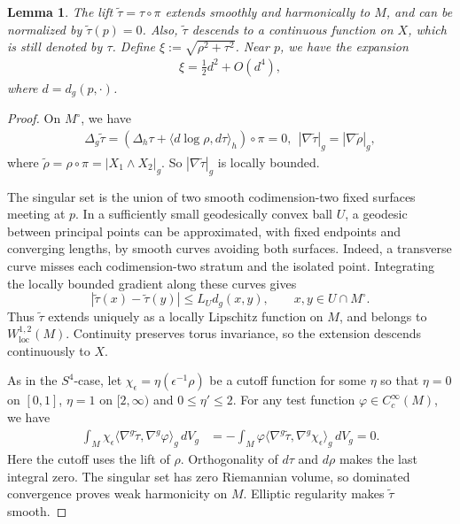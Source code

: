 \documentclass[letterpaper]{amsart}
\newtheorem{lem}[thm]{Lemma}
\theoremstyle{definition}
\theoremstyle{remark}
\begin{document}
\begin{lem}\label{lem-conjugate}
	The lift $\tilde{\tau }=\tau \circ \pi $ extends smoothly and harmonically to $M$, and can be normalized by $\tilde{\tau} (p)=0$. Also, $\tilde{\tau }$ descends to a continuous function on $X$, which is still denoted by $\tau $. Define $\xi := \sqrt{\rho ^2+ \tau ^2} $. Near $p$, we have the expansion
	\begin{align*}
		\xi = \frac{1}{2}d ^2+ O(d ^{4}),
	\end{align*} 
	where $d = d_g(p, \cdot )$.
\end{lem}
\begin{proof}
	On $M ^{\circ}$, we have
	\begin{align*}
		\Delta _{g} \tilde{\tau } = ( \Delta _{h} \tau + \langle d \log \rho , d \tau  \rangle_h ) \circ \pi =0,\ \ |\nabla \tilde{\tau }|_g = |\nabla \tilde{\rho }|_g,
	\end{align*} 
	where $\tilde{\rho } = \rho \circ \pi = |X_1 \wedge X_2|_g$. So $|\nabla \tilde{\tau }|_g$ is locally bounded.

	The singular set is the union of two smooth codimension-two fixed surfaces meeting at $p$. In a sufficiently small geodesically convex ball $U$, a geodesic between principal points can be approximated, with fixed endpoints and converging lengths, by smooth curves avoiding both surfaces. Indeed, a transverse curve misses each codimension-two stratum and the isolated point. Integrating the locally bounded gradient along these curves gives
\[
 |\tilde\tau(x)-\tilde\tau(y)|\le L_Ud_g(x,y),\qquad x,y\in U\cap M^\circ.
\]
Thus $\tilde\tau$ extends uniquely as a locally Lipschitz function on $M$, and belongs to $W^{1,2}_{\mathrm{loc}}(M)$. Continuity preserves torus invariance, so the extension descends continuously to $X$.

	As in the $S^4$-case, let $\chi _{\epsilon } = \eta (\epsilon ^{-1} \rho )$ be a cutoff function for some $\eta $ so that $\eta =0$ on $[0,1]$, $\eta =1$ on $[2, \infty)$ and $0 \leq \eta ' \leq 2$. For any test function $\varphi \in C ^{\infty}_{c}(M)$, we have
\begin{align*}
	\int_M\chi_\epsilon\langle\nabla^g\tilde\tau,\nabla^g\varphi\rangle_g\,dV_g
 &= -\int_M\varphi\langle\nabla^g\tilde\tau,\nabla^g\chi_\epsilon\rangle_g\,dV_g=0.
\end{align*} 
Here the cutoff uses the lift of $\rho$. Orthogonality of $d\tau$ and $d\rho$ makes the last integral zero. The singular set has zero Riemannian volume, so dominated convergence proves weak harmonicity on $M$. Elliptic regularity makes $\tilde\tau$ smooth.


\end{proof}
\end{document}
